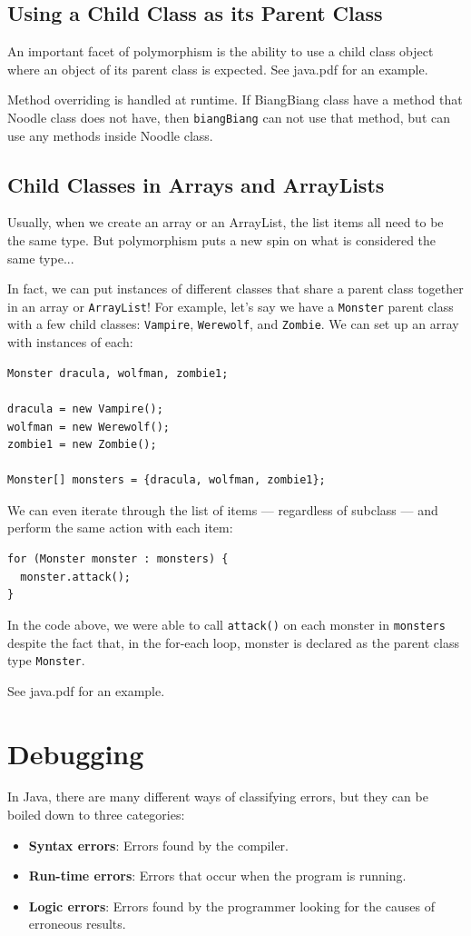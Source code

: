 \documentclass[a4paper, 12pt]{article}
\begin{document}
\subsection{Using a Child Class as its Parent Class}
An important facet of polymorphism is the ability to use a child class object where an object of its parent class is expected. See java.pdf for an example.

Method overriding is handled at runtime. If BiangBiang class have a method that Noodle class does	not have, then \verb|biangBiang| can not use that method, but can use any methods inside Noodle class.

\subsection{Child Classes in Arrays and ArrayLists}
Usually, when we create an array or an ArrayList, the list items all need to be the same type. But polymorphism puts a new spin on what is considered the same type...

In fact, we can put instances of different classes that share a parent class together in an array or \verb|ArrayList|! For example, let's say we have a \verb|Monster| parent class with a few child classes: \verb|Vampire|, \verb|Werewolf|, and \verb|Zombie|. We can set up an array with instances of each:
\begin{verbatim}
Monster dracula, wolfman, zombie1;

dracula = new Vampire();
wolfman = new Werewolf();
zombie1 = new Zombie();

Monster[] monsters = {dracula, wolfman, zombie1};
\end{verbatim}

We can even iterate through the list of items — regardless of subclass — and perform the same action with each item:
\begin{verbatim}
for (Monster monster : monsters) {
  monster.attack();
}
\end{verbatim}
In the code above, we were able to call \verb|attack()| on each monster in \verb|monsters| despite the fact that, in the for-each loop, monster is declared as the parent class type \verb|Monster|.

See java.pdf for an example.


\section{Debugging}
In Java, there are many different ways of classifying errors, but they can be boiled down to three categories:
\begin{itemize}
\item \textbf{Syntax errors}: Errors found by the compiler.

\item \textbf{Run-time errors}: Errors that occur when the program is running.

\item \textbf{Logic errors}: Errors found by the programmer looking for the causes of erroneous results.

\end{itemize}
\end{document}
